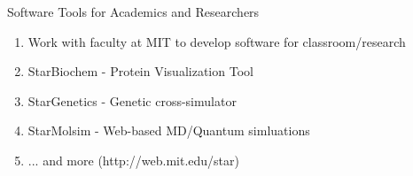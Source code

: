 \begin{frame}{Software Tools for Academics and Researchers}
\begin{enumerate}
	\item Work with faculty at MIT to develop software for classroom/research
	\item StarBiochem - Protein Visualization Tool
	\item StarGenetics - Genetic cross-simulator
	\item StarMolsim - Web-based MD/Quantum simluations
	\item ... and more (http://web.mit.edu/star)
\end{enumerate}
\end{frame}
